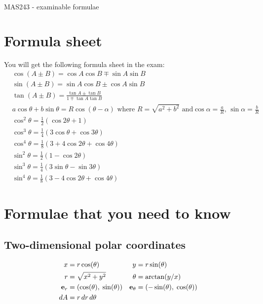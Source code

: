 \documentclass{amsart}
\begin{document}
\begin{center}
 \Large MAS243 - examinable formulae
\end{center}

\section*{Formula sheet}

You will get the following formula sheet in the exam:
\begin{displaymath}
\begin{aligned}
&
\cos (A\pm B) = \cos A \cos B \mp \sin A \sin B
\\
&
\sin (A \pm B) = \sin A \cos B \pm \cos A \sin B
\\
&
\tan (A \pm B) = \frac {\tan A \pm \tan B}{1 \mp \tan A \tan B}
\\
&
a \cos \theta + b \sin \theta = R \cos (\theta - \alpha )
{\mbox { where $R={\sqrt {a^{2}+b^{2}}}$ and
$\cos \alpha = \frac {a}{R}$, $\sin \alpha = \frac {b}{R}$}}
\\
&
\cos ^{2} \theta = \frac {1}{2} \left( \cos 2 \theta +1 \right)
\\
&
\cos ^{3} \theta = \frac {1}{4} \left( 3 \cos \theta +
\cos 3 \theta \right)
\\
&
\cos ^{4} \theta = \frac {1}{8} \left( 3 + 4 \cos 2 \theta
+ \cos 4 \theta \right)
\\
&
\sin ^{2} \theta = \frac {1}{2} \left( 1 - \cos 2 \theta \right)
\\
&
\sin ^{3} \theta = \frac {1}{4} \left( 3 \sin \theta -\sin 3 \theta
\right)
\\
&
\sin ^{4} \theta = \frac {1}{8} \left( 3 - 4\cos 2 \theta
+\cos 4 \theta \right)
\end{aligned}
\end{displaymath}

\section*{Formulae that you need to know}

\subsection*{Two-dimensional polar coordinates}

\begin{align*}
 x &= r\cos(\theta) & y &= r\sin(\theta) \\
 r &= \sqrt{x^2+y^2} & \theta &= \arctan(y/x) \\
 \mathbf{e}_r &= (\cos(\theta),\;\sin(\theta)) & \mathbf{e}_\theta &= (-\sin(\theta),\;\cos(\theta)) \\
 dA &= r\,dr\,d\theta
\end{align*}
\end{document}

